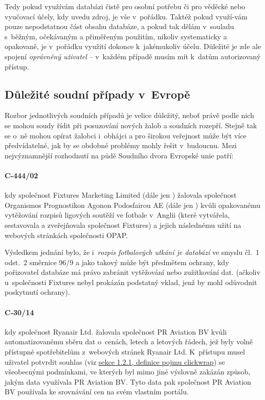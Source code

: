 \documentclass[thesis=B,czech]{FITthesis}[2012/06/26]
\begin{document}
Tedy pokud využívám databázi čistě pro osobní potřebu či pro věděcké nebo vyučovací účely, kdy uvedu zdroj, je vše v~pořádku. Taktéž pokud využí-vám pouze nepodstatnou část obsahu databáze, a pokud tak dělám v~souladu s~běžným, očekávaným a přiměřeným použitím, nikoliv systematicky a opakovaně, je v~pořádku využití dokonce k~jakémukoliv účelu. Důležité je zde ale spojení \textit{oprávněný uživatel} -- v~každém případě musím mít k~datům autorizovaný přístup.

\subsection{Důležité soudní případy v~Evropě}
Rozbor jednotlivých soudních případů je velice důležitý, neboť právě podle nich se mohou soudy řídit při posuzování nových žalob a soudních rozepří. Stejně tak se o~ně mohou opírat žalobci i~obhájci a pro širokou veřejnost může být více předvídatelné, jak by se obdobné problémy mohly řešit v~budoucnu. Mezi nejvýznamnější rozhodnutí na půdě Soudního dvora Evropské unie patří:

\paragraph{C-444/02} kdy společnost Fixtures Marketing Limited (dále jen ) žalovala společnost Organismos Prognostikon Agonon Podosfairou AE (dále jen ) kvůli opakovanému vytěžování rozpisů ligových soutěží ve fotbale v~Anglii (které vytvářela, sestavovala a zveřejňovala společnost Fixtures) a jejich následnému užití na webových stránkách společnosti OPAP.~\cite{C-444/02_1}

Výsledkem jednání bylo, že i~\emph{rozpis fotbalových utkání je databází} ve smyslu čl.~1 odst.~2 směrnice 96/9 a jako takový může být předmětem ochrany, kdy pořizovatel databáze má právo zabránit vytěžování nebo zužitkování dat. (ačkoliv u~společnosti Fixtures nebyl prokázán podstatný vklad, jenž by mohl odůvodnit poskytnutí ochrany).~\cite{C-444/02_2}

\paragraph{C‑30/14} kdy společnost Ryanair Ltd. žalovala společnost PR Aviation BV kvůli automatizovanému sběru dat o~cenách, letech a letových řádech, jež byly volně přístupné spotřebitelům z~webových stránek Ryanair Ltd. K~přístupu musel uživatel potvrdit souhlas (viz \hyperref[def:clickwrap]{sekce 1.2.1, definice pojmu clickwrap}) se všeobecnými podmínkami, ve kterých byl mimo jiné výslovně zakázán způsob, jakým data využívala PR Aviation BV. Tyto data pak společnost PR Aviation BV používala ke srovnávání cen na svém vlastním portálu.~\cite{C-30/14}
\end{document}
